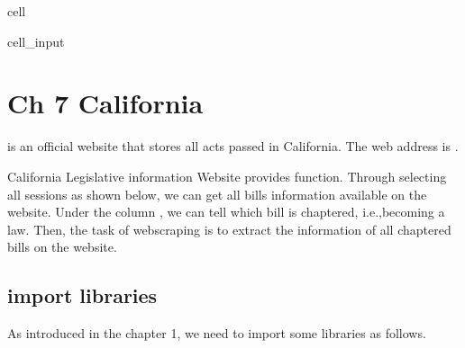 \documentclass[letterpaper,10pt,english]{jupyterBook}
\begin{document}
\begin{sphinxuseclass}{cell}
\begin{sphinxVerbatimInput}
\begin{sphinxuseclass}{cell_input}
\begin{sphinxVerbatim}[commandchars=\\\{\}]
\end{sphinxVerbatim}

\end{sphinxuseclass}\end{sphinxVerbatimInput}

\end{sphinxuseclass}
\sphinxstepscope


\chapter{Ch 7 California}
\label{\detokenize{ch7:ch-7-california}}\label{\detokenize{ch7::doc}}
\sphinxAtStartPar
{} is an official website that stores all acts passed in California. The web address is .

\sphinxAtStartPar
{}

\sphinxAtStartPar
California Legislative information Website provides  function. Through selecting all sessions as shown below, we can get all bills information available on the website. Under the column , we can tell which bill is chaptered, i.e.,becoming a law. Then, the task of webscraping is to extract the information of all chaptered bills on the website.

\sphinxAtStartPar
{}


\section{import libraries}
\label{\detokenize{ch7:import-libraries}}
\sphinxAtStartPar
As introduced in the chapter 1, we need to import some libraries as follows.
\end{document}
